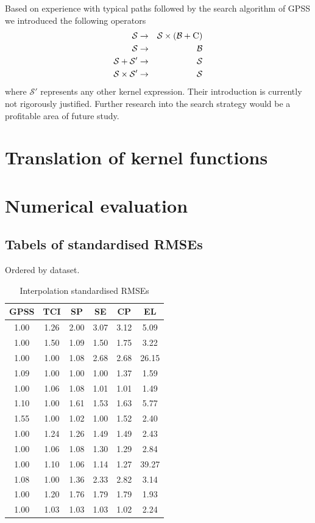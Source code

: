 \documentclass{article}
\begin{document}
Based on experience with typical paths followed by the search algorithm of GPSS we introduced the following operators
%
\begin{eqnarray}
\mathcal{S} &\to& \mathcal{S} \times (\mathcal{B} + {\textsc{C}})\\
\mathcal{S} &\to& \mathcal{B}\\
\mathcal{S} + \mathcal{S'} &\to& \mathcal{S}\\
\mathcal{S} \times \mathcal{S'} &\to& \mathcal{S}
\end{eqnarray}
%
where $\mathcal{S'}$ represents any other kernel expression.
Their introduction is currently not rigorously justified.
Further research into the search strategy would be a profitable area of future study.

\section{Translation of kernel functions}

\section{Numerical evaluation}

\subsection{Tabels of standardised RMSEs}

Ordered by dataset.

\begin{table}
\begin{tabular}{|c|c|c|c|c|c|}
\hline
GPSS & TCI & SP & SE & CP & EL \\
\hline
1.00 & 1.26 & 2.00 & 3.07 & 3.12 & 5.09\\
1.00 & 1.50 & 1.09 & 1.50 & 1.75 & 3.22\\
1.00 & 1.00 & 1.08 & 2.68 & 2.68 & 26.15\\
1.09 & 1.00 & 1.00 & 1.00 & 1.37 & 1.59\\
1.00 & 1.06 & 1.08 & 1.01 & 1.01 & 1.49\\
1.10 & 1.00 & 1.61 & 1.53 & 1.63 & 5.77\\
1.55 & 1.00 & 1.02 & 1.00 & 1.52 & 2.40\\
1.00 & 1.24 & 1.26 & 1.49 & 1.49 & 2.43\\
1.00 & 1.06 & 1.08 & 1.30 & 1.29 & 2.84\\
1.00 & 1.10 & 1.06 & 1.14 & 1.27 & 39.27\\
1.08 & 1.00 & 1.36 & 2.33 & 2.82 & 3.14\\
1.00 & 1.20 & 1.76 & 1.79 & 1.79 & 1.93\\
1.00 & 1.03 & 1.03 & 1.03 & 1.02 & 2.24\\
\hline
\end{tabular}
\caption{Interpolation standardised RMSEs}
\end{table}
\end{document}
